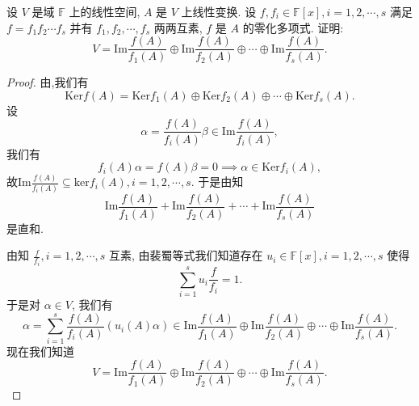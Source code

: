 \documentclass[../../main.tex]{subfiles}%
\begin{document}
\begin{proposition}\label{proposition:互素分式多项式诱导的值域直和分解}
设 $V$ 是域 $\mathbb{F}$ 上的线性空间, $A$ 是 $V$ 上线性变换. 设 $f, f_i \in \mathbb{F}[x], i = 1, 2, \cdots, s$ 满足 $f = f_1f_2\cdots f_s$ 并有 $f_1, f_2, \cdots, f_s$ 两两互素, $f$ 是 $A$ 的零化多项式. 证明:
$$
V = \mathrm{Im} \frac{f(A)}{f_1(A)} \oplus \mathrm{Im} \frac{f(A)}{f_2(A)} \oplus \cdots \oplus \mathrm{Im} \frac{f(A)}{f_s(A)}.
$$
\end{proposition}
\begin{proof}
由,我们有
$$
\mathrm{Ker} f(A) = \mathrm{Ker} f_1(A) \oplus \mathrm{Ker} f_2(A) \oplus \cdots \oplus \mathrm{Ker} f_s(A).
$$
设
$$
\alpha = \frac{f(A)}{f_i(A)} \beta \in \mathrm{Im} \frac{f(A)}{f_i(A)},
$$
我们有
$$
f_i(A) \alpha = f(A) \beta = 0 \implies \alpha \in \mathrm{Ker} f_i(A),
$$
故$\mathrm{Im}\frac{f\left( A \right)}{f_i\left( A \right)}\subseteq \mathrm{ker}f_i\left( A \right) ,i=1,2,\cdots ,s.$
于是由知
$$
\mathrm{Im} \frac{f(A)}{f_1(A)} + \mathrm{Im} \frac{f(A)}{f_2(A)} + \cdots + \mathrm{Im} \frac{f(A)}{f_s(A)}
$$
是直和.

由知 $\frac{f}{f_i}, i = 1, 2, \cdots, s$ 互素, 由裴蜀等式我们知道存在 $u_i \in \mathbb{F}[x], i = 1, 2, \cdots, s$ 使得
$$
\sum_{i=1}^s u_i \frac{f}{f_i} = 1.
$$
于是对 $\alpha \in V$, 我们有
$$
\alpha = \sum_{i=1}^s \frac{f(A)}{f_i(A)} (u_i(A) \alpha) \in \mathrm{Im} \frac{f(A)}{f_1(A)} \oplus \mathrm{Im} \frac{f(A)}{f_2(A)} \oplus \cdots \oplus \mathrm{Im} \frac{f(A)}{f_s(A)}.
$$
现在我们知道
$$
V = \mathrm{Im} \frac{f(A)}{f_1(A)} \oplus \mathrm{Im} \frac{f(A)}{f_2(A)} \oplus \cdots \oplus \mathrm{Im} \frac{f(A)}{f_s(A)}.
$$
\end{proof}
\end{document}
